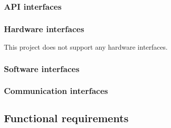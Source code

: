 \documentclass[18pt,oneside,a4paper, titlepage]{article}
\begin{document}
		\subsubsection{API interfaces}
		\subsubsection{Hardware interfaces}
		This project does not support any hardware interfaces.
		\subsubsection{Software interfaces}
		\subsubsection{Communication interfaces}
	\subsection{Functional requirements}
\end{document}
